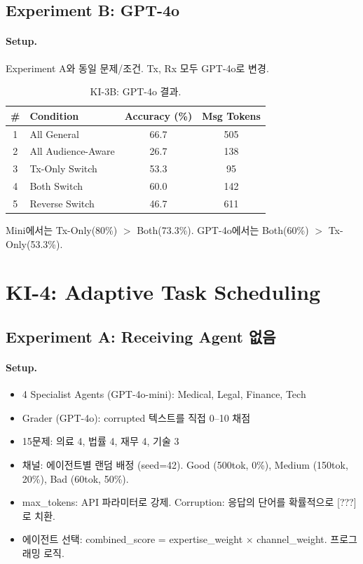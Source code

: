 \documentclass[11pt]{article}
\begin{document}

\subsection{Experiment B: GPT-4o}

\paragraph{Setup.}
Experiment A와 동일 문제/조건. Tx, Rx 모두 GPT-4o로 변경.

\begin{table}[h]
\centering
\caption{KI-3B: GPT-4o 결과.}
\begin{tabular}{clcc}
\toprule
\# & Condition & Accuracy (\%) & Msg Tokens \\
\midrule
1 & All General        & 66.7  & 505 \\
2 & All Audience-Aware & 26.7  & 138 \\
3 & Tx-Only Switch     & 53.3 &  95 \\
4 & Both Switch        & 60.0 & 142 \\
5 & Reverse Switch     & 46.7  & 611 \\
\bottomrule
\end{tabular}
\end{table}

Mini에서는 Tx-Only(80\%) $>$ Both(73.3\%). GPT-4o에서는 Both(60\%) $>$ Tx-Only(53.3\%).

\section{KI-4: Adaptive Task Scheduling}

\subsection{Experiment A: Receiving Agent 없음}

\paragraph{Setup.}
\begin{itemize}[nosep]
  \item 4 Specialist Agents (GPT-4o-mini): Medical, Legal, Finance, Tech
  \item Grader (GPT-4o): corrupted 텍스트를 직접 0--10 채점
  \item 15문제: 의료 4, 법률 4, 재무 4, 기술 3
  \item 채널: 에이전트별 랜덤 배정 (seed=42). Good (500tok, 0\%), Medium (150tok, 20\%), Bad (60tok, 50\%).
  \item max\_tokens: API 파라미터로 강제. Corruption: 응답의 단어를 확률적으로 {[}???{]}로 치환.
  \item 에이전트 선택: combined\_score = expertise\_weight $\times$ channel\_weight. 프로그래밍 로직.
\end{itemize}
\end{document}
